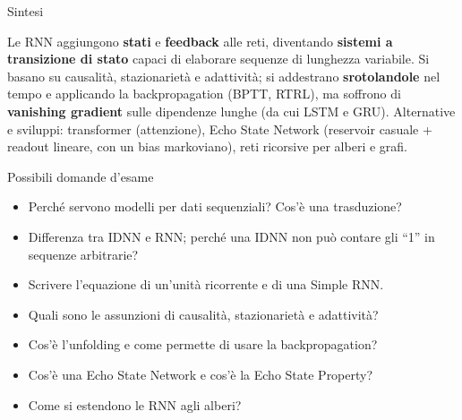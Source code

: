 \begin{boxabstract}{Sintesi}

Le RNN aggiungono \textbf{stati} e \textbf{feedback} alle reti,
diventando \textbf{sistemi a transizione di stato} capaci di elaborare
sequenze di lunghezza variabile. Si basano su causalità, stazionarietà e
adattività; si addestrano \textbf{srotolandole} nel tempo e applicando
la backpropagation (BPTT, RTRL), ma soffrono di \textbf{vanishing
gradient} sulle dipendenze lunghe (da cui LSTM e GRU). Alternative e
sviluppi: transformer (attenzione), Echo State Network (reservoir
casuale + readout lineare, con un bias markoviano), reti ricorsive per
alberi e grafi.

\end{boxabstract}

\begin{boxquestion}{Possibili domande d'esame}

\begin{itemize}
\tightlist
\item
  Perché servono modelli per dati sequenziali? Cos'è una trasduzione?
\item
  Differenza tra IDNN e RNN; perché una IDNN non può contare gli ``1''
  in sequenze arbitrarie?
\item
  Scrivere l'equazione di un'unità ricorrente e di una Simple RNN.
\item
  Quali sono le assunzioni di causalità, stazionarietà e adattività?
\item
  Cos'è l'unfolding e come permette di usare la backpropagation?
\item
  Cos'è una Echo State Network e cos'è la Echo State Property?
\item
  Come si estendono le RNN agli alberi?
\end{itemize}

\end{boxquestion}
